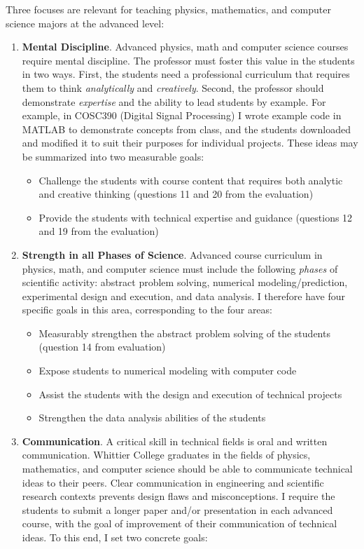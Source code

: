 \documentclass[../../main.tex]{subfiles}
\begin{document}
Three focuses are relevant for teaching physics, mathematics, and computer science majors at the advanced level:
\begin{enumerate}
\item \textbf{Mental Discipline}.  Advanced physics, math and computer science courses require mental discipline.  The professor must foster this value in the students in two ways.  First, the students need a professional curriculum that requires them to think \textit{analytically} and \textit{creatively}.  Second, the professor should demonstrate \textit{expertise} and the ability to lead students by example.  For example, in COSC390 (Digital Signal Processing) I wrote example code in MATLAB to demonstrate concepts from class, and the students downloaded and modified it to suit their purposes for individual projects. These ideas may be summarized into two measurable goals:

\begin{itemize}
\item Challenge the students with course content that requires both analytic and creative thinking (questions 11 and 20 from the evaluation)
\item Provide the students with technical expertise and guidance (questions 12 and 19 from the evaluation)
\end{itemize}

\item \textbf{Strength in all Phases of Science}. Advanced course curriculum in physics, math, and computer science must include the following \textit{phases} of scientific activity: abstract problem solving, numerical modeling/prediction, experimental design and execution, and data analysis. I therefore have four specific goals in this area, corresponding to the four areas:

\begin{itemize}
\item Measurably strengthen the abstract problem solving of the students (question 14 from evaluation)
\item Expose students to numerical modeling with computer code  %
\item Assist the students with the design and execution of technical projects %
\item Strengthen the data analysis abilities of the students %
\end{itemize}

\item \textbf{Communication}.  A critical skill in technical fields is oral and written communication.  Whittier College graduates in the fields of physics, mathematics, and computer science should be able to communicate technical ideas to their peers.  Clear communication in engineering and scientific research contexts prevents design flaws and misconceptions.  I require the students to submit a longer paper and/or presentation in each advanced course, with the goal of improvement of their communication of technical ideas.  To this end, I set two concrete goals:


\end{enumerate}
\end{document}
